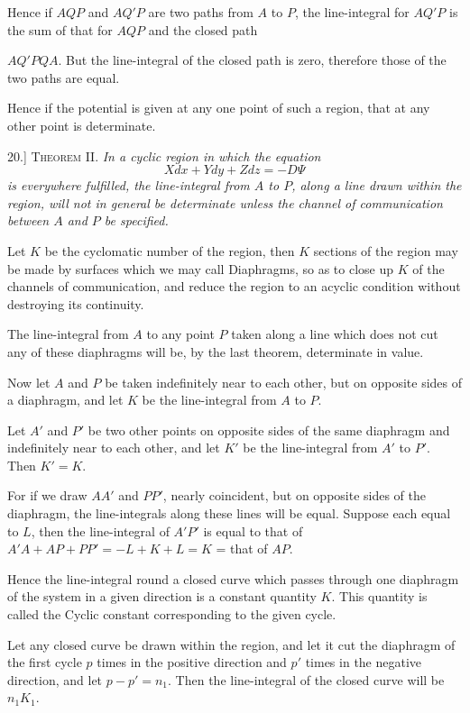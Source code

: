 \documentclass[11pt,a4paper]{article}
\begin{document}
Hence if \(AQP\) and \(AQ'P\) are two paths from \(A\) to \(P\), the
line-integral for \(AQ'P\) is the sum of that for \(AQP\) and the closed
path

\clearpage

\(AQ'PQA\). But the line-integral of the closed path is zero, therefore
those of the two paths are equal.

Hence if the potential is given at any one point of such a region, that
at any other point is determinate.

20.] \textsc{Theorem II.} \textit{In a cyclic region in which the equation}
\[
Xdx+Ydy+Zdz=-D\Psi
\]
\textit{is everywhere fulfilled, the line-integral from \(A\) to \(P\),
along a line drawn within the region, will not in general be determinate
unless the channel of communication between \(A\) and \(P\) be specified.}

Let \(K\) be the cyclomatic number of the region, then \(K\) sections of
the region may be made by surfaces which we may call Diaphragms, so as
to close up \(K\) of the channels of communication, and reduce the
region to an acyclic condition without destroying its continuity.

The line-integral from \(A\) to any point \(P\) taken along a line which
does not cut any of these diaphragms will be, by the last theorem,
determinate in value.

Now let \(A\) and \(P\) be taken indefinitely near to each other, but on
opposite sides of a diaphragm, and let \(K\) be the line-integral from
\(A\) to \(P\).

Let \(A'\) and \(P'\) be two other points on opposite sides of the same
diaphragm and indefinitely near to each other, and let \(K'\) be the
line-integral from \(A'\) to \(P'\). Then \(K'=K\).

For if we draw \(AA'\) and \(PP'\), nearly coincident, but on opposite
sides of the diaphragm, the line-integrals along these lines will be
equal. Suppose each equal to \(L\), then the line-integral of \(A'P'\)
is equal to that of \(A'A+AP+PP'=-L+K+L=K\) = that of \(AP\).

Hence the line-integral round a closed curve which passes through one
diaphragm of the system in a given direction is a constant quantity
\(K\). This quantity is called the Cyclic constant corresponding to the
given cycle.

Let any closed curve be drawn within the region, and let it cut the
diaphragm of the first cycle \(p\) times in the positive direction and
\(p'\) times in the negative direction, and let \(p-p'=n_1\). Then the
line-integral of the closed curve will be \(n_1K_1\).
\end{document}
